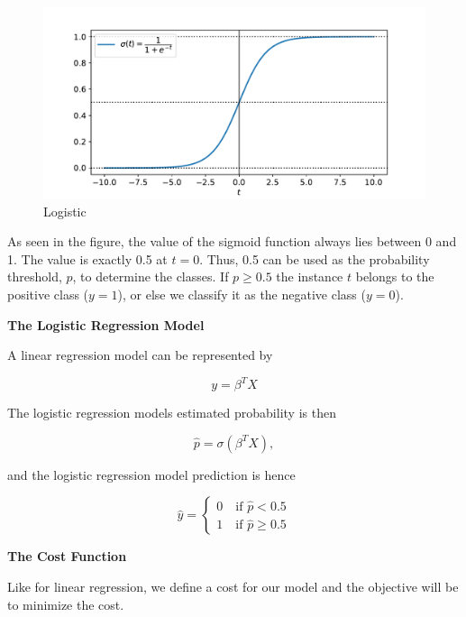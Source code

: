 \begin{figure}[H]
\begin{center}\includegraphics[scale=0.6]{latex/figures/logistic_function.pdf}
\end{center}
\caption{Logistic}
\label{fig:logistic}
\end{figure}

As seen in the figure, the value of the sigmoid function always lies between 0 and 1. The value is exactly 0.5 at $t=0$. Thus, 0.5 can be used as the probability threshold, $p$, to determine the classes. If $p \geq 0.5$ the instance $t$ belongs to the positive class ($y = 1$), or else we classify it as the negative class ($y = 0$).

\textbf{The Logistic Regression Model}

A linear regression model can be represented by

\begin{equation}
    y = \beta^T X
\end{equation}

The logistic regression models estimated probability is then

\begin{equation}
    \hat{p} = \sigma (\beta^T X),
\end{equation}

and the logistic regression model prediction is hence

\begin{equation}
\hat{y} = \begin{cases} 0 \quad \text{if } \hat{p} < 0.5 \\ 1 \quad \text{if } \hat{p} \geq 0.5 \end{cases} 
\end{equation}

\textbf{The Cost Function}

Like for linear regression, we define a cost for our model and the objective will be to minimize the cost.

